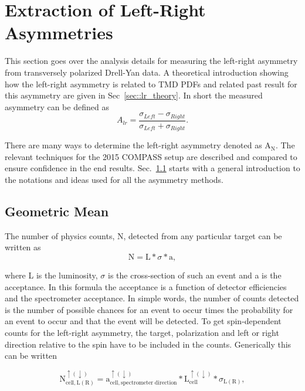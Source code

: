 \section{Extraction of Left-Right Asymmetries} \label{sec::leftrightasym}

This section goes over the analysis details for measuring the left-right
asymmetry from transversely polarized Drell-Yan data.  A theoretical
introduction showing how the left-right asymmetry is related to TMD PDFs and
related past result for this asymmetry are given in Sec~\ref{sec::lr_theory}.
In short the measured asymmetry can be defined as
\begin{equation}
  A_{lr} = \frac{\sigma_{Left} - \sigma_{Right}}{\sigma_{Left} +
    \sigma_{Right}}.
\end{equation}

There are many ways to determine the left-right asymmetry denoted as
A$_{\mathrm{N}}$.  The relevant techniques for the 2015 COMPASS setup are
described and compared to ensure confidence in the end results.
Sec.~\ref{sec::GeoMean} starts with a general introduction to the notations and
ideas used for all the asymmetry methods.

\subsection{Geometric Mean} \label{sec::GeoMean}
The number of physics counts, N, detected from any particular target can be
written as
\begin{equation}
  \label{equ::xsection}
  \mathrm{N} = \mathrm{L} * \sigma * \mathrm{a},
\end{equation}

\noindent
where L is the luminosity, $\sigma$ is the cross-section of such an event and a
is the acceptance.  In this formula the acceptance is a function of detector
efficiencies and the spectrometer acceptance.  In simple words, the number of
counts detected is the number of possible chances for an event to occur times
the probability for an event to occur and that the event will be detected.  To
get spin-dependent counts for the left-right asymmetry, the target, polarization
and left or right direction relative to the spin have to be included in the
counts.  Generically this can be written

\begin{equation}
  \label{equ::indexedCount}
  \mathrm{N}^{\uparrow(\downarrow)}_{\mathrm{cell},\mathrm{L(R)}} =
  \mathrm{a}^{\uparrow(\downarrow)}_{\mathrm{cell},\mathrm{spectrometer \;
      direction}} * \mathrm{L}^{\uparrow(\downarrow)}_{\mathrm{cell}} *
  \sigma_{\mathrm{L(R)}},
\end{equation}

